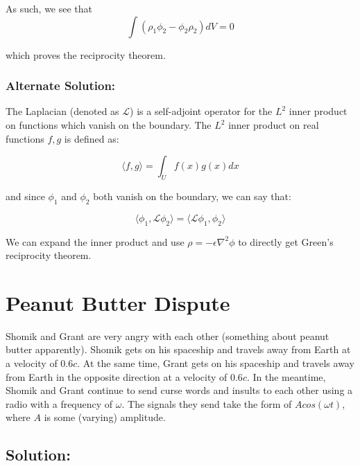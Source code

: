 \documentclass{article}
\begin{document}
As such, we see that 
\[
\int (\rho_1\phi_2 - \phi_2\rho_2 )dV = 0
\]

which proves the reciprocity theorem.

\subsubsection{Alternate Solution:} The Laplacian (denoted as $\mathcal{L}$) is a self-adjoint operator for the $L^2$ inner product on functions which vanish on the boundary. The $L^2$ inner product on real functions $f,g$  is defined as:

\[
\langle f, g\rangle = \int_U f(x) g(x) dx
\]

and since $\phi_1$ and $\phi_2$ both vanish on the boundary, we can say that:

\[
\langle \phi_1, \mathcal{L}\phi_2\rangle = \langle \mathcal{L} \phi_1, \phi_2\rangle
\]

We can expand the inner product and use $\rho = -\epsilon\nabla^2 \phi$ to directly get Green's reciprocity theorem.

\newpage

\section{Peanut Butter Dispute}

Shomik and Grant are very angry with each other (something about peanut butter apparently). Shomik gets on his spaceship and travels away from Earth at a velocity of $0.6c$.  At the same time, Grant gets on his spaceship and travels away from Earth in the opposite direction at a velocity of $0.6c$. In the meantime, Shomik and Grant continue to send curse words and insults to each other using a radio with a frequency of $\omega$. The signals they send take the form of $Acos(\omega t)$, where $A$ is some (varying) amplitude.

\subsection{Solution:}
\end{document}
